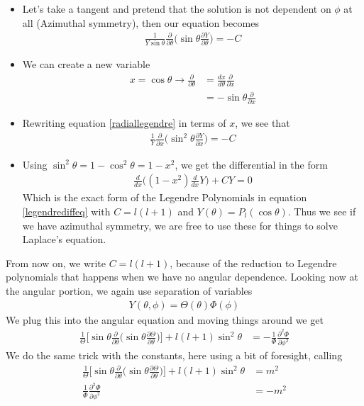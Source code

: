 \begin{itemize}
\item Let's take a tangent and pretend that the solution is not dependent on $\phi$ at all (Azimuthal symmetry), then our equation becomes
\begin{align}\label{radiallegendre}
\frac{1}{Y\sin\theta}\frac{\partial}{\partial \theta}\Big(\sin\theta\frac{\partial Y}{\partial\theta}\Big) =-C
\end{align}
\item We can create a new variable
\begin{align}\label{xsub}
x = \cos\theta \rightarrow \frac{\partial}{\partial\theta} &=\frac{dx}{d\theta} \frac{\partial}{\partial x}\\
&= -\sin\theta\frac{\partial}{\partial x}
\end{align}
\item Rewriting equation \ref{radiallegendre} in terms of $x$, we see that
\begin{align}
\frac{1}{Y}\frac{\partial}{\partial x}\Big(\sin^2\theta\frac{\partial Y}{\partial x}\Big) = -C
\end{align}
\item Using $\sin^2\theta = 1-\cos^2\theta = 1-x^2$, we get the differential in the form
\begin{align}
\frac{d}{dx}\Big((1-x^2)\frac{d}{dx}Y\Big) + CY = 0
\end{align}
Which is the exact form of the Legendre Polynomials in equation \ref{legendrediffeq} with $C = l(l+1)$ and $Y(\theta) = P_l(\cos\theta)$. Thus we see if we have azimuthal symmetry, we are free to use these for things to solve Laplace's equation.
\end{itemize}
From now on, we write $C = l(l+1)$, because of the reduction to Legendre polynomials that happens when we have no angular dependence. Looking now at the angular portion, we again use separation of variables
\begin{align}
Y(\theta,\phi) = \Theta(\theta)\Phi(\phi)
\end{align}
We plug this into the angular equation and moving things around we get
\begin{align}
\frac{1}{\Theta}\Big[\sin\theta\frac{\partial}{\partial\theta}\Big(\sin\theta\frac{\partial \Theta}{\partial\theta}\Big)\Big] +l(l+1)\sin^2\theta  &= -\frac{1}{\Phi}\frac{\partial^2 \Phi}{\partial\phi^2}
\end{align}
We do the same trick with the constants, here using a bit of foresight, calling 
\begin{align}
\frac{1}{\Theta}\Big[\sin\theta\frac{\partial}{\partial\theta}\Big(\sin\theta\frac{\partial \Theta}{\partial\theta}\Big)\Big] +l(l+1)\sin^2\theta &= m^2\\
\frac{1}{\Phi}\frac{\partial^2 \Phi}{\partial\phi^2} &= -m^2
\end{align}
